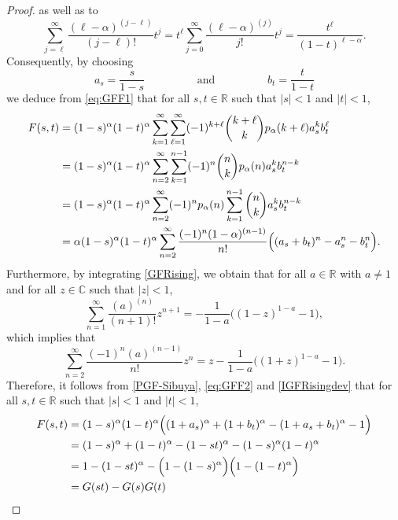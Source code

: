 \documentclass[twoside,12pt]{article}
\newcommand{\dR}{\mathbb{R}}
\newcommand{\dC}{\mathbb{C}}
\begin{document}
\begin{proof}
as well as to
\begin{equation*}
\sum_{j=\ell}^\infty \frac{(\ell-\alpha)^{(j-\ell)}}{(j-\ell)!} t^j=t^\ell \sum_{j=0}^\infty \frac{(\ell-\alpha)^{(j)}}{j!} t^j= \frac{t^\ell}{(1-t)^{\ell-\alpha}}.
\end{equation*}
Consequently, by choosing
$$
a_s=\frac{s}{1-s} \hspace{2cm} \text{and} \hspace{2cm} b_t=\frac{t}{1-t}
$$
we deduce from \eqref{eq:GFF1} that for all $s,t \in \dR$ such that $|s|<1$ and $|t|<1$,
\begin{align}
F(s,t) &= (1-s)^\alpha (1-t)^\alpha \sum_{k=1}^\infty \sum_{\ell=1}^\infty (-1)^{k+\ell} \binom{k+\ell}{k} 
p_\alpha(k+\ell) a_s^k b_t^\ell \notag \\
&= (1-s)^\alpha (1-t)^\alpha \sum_{n=2}^\infty \sum_{k=1}^{n-1} (-1)^{n} \binom{n}{k} p_\alpha(n) a_s^k b_t^{n-k} \notag \\
&= (1-s)^\alpha (1-t)^\alpha \sum_{n=2}^\infty  (-1)^{n} p_\alpha(n) \sum_{k=1}^{n-1} \binom{n}{k}  a_s^k b_t^{n-k} \notag \\
&= \alpha (1-s)^\alpha (1-t)^\alpha \sum_{n=2}^\infty  \frac{(-1)^{n} (1-\alpha)^{(n-1)}}{n!} \Big( (a_s+b_t)^n - a_s^n - b_t^n \Big).  
\label{eq:GFF2}
\end{align}
Furthermore, by integrating \eqref{GFRising}, we obtain that for all $a\in \dR$ with $a \neq 1$ and for all $z \in \dC$ such that $|z|<1$, 
\begin{equation}
\label{IGFRising}
\sum_{n=1}^\infty \frac{(a)^{(n)}}{(n+1)!} z^{n+1}= -\frac{1}{1-a} \Big( (1-z)^{1-a} -1 \Big),
\end{equation}
which implies that
\begin{equation}
\label{IGFRisingdev}
\sum_{n=2}^\infty \frac{(-1)^n (a)^{(n-1)}}{n!} z^{n}= z -\frac{1}{1-a} \Big( (1+z)^{1-a} -1 \Big).
\end{equation}
Therefore, it follows from \eqref{PGF-Sibuya}, \eqref{eq:GFF2} and \eqref{IGFRisingdev} that for all $s,t \in \dR$ such that $|s|<1$ and $|t|<1$,
\begin{align}
F(s,t)&= (1-s)^\alpha (1-t)^\alpha \Big( (1+a_s)^{\alpha} + (1+b_t)^{\alpha} - (1+a_s+b_t)^{\alpha} -1  \Big) \notag \\
&= (1-s)^\alpha + (1-t)^\alpha -(1-st)^\alpha - (1-s)^\alpha (1-t)^\alpha \notag \\
&= 1-(1-st)^\alpha - \Big( 1-(1-s)^\alpha \Big) \Big( 1-(1-t)^\alpha \Big) \notag \\
&= G(st)-G(s)G(t)
\label{eq:GFF3}

\end{align}
\end{proof}
\end{document}
